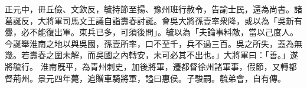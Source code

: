\begin{pinyinscope}
 
正元中，毌丘儉、文欽反，毓持節至揚、豫州班行赦令，告諭士民，還為尚書。諸葛誕反，大將軍司馬文王議自詣壽春討誕。會吳大將孫壹率衆降，或以為「吳新有釁，必不能復出軍。東兵已多，可須後問」。毓以為「夫論事料敵，當以己度人。今誕舉淮南之地以與吳國，孫壹所率，口不至千，兵不過三百。吳之所失，蓋為無幾。若壽春之圍未解，而吳國之內轉安，未可必其不出也。」大將軍曰：「善。」遂將毓行。
 淮南旣平，為青州刺史，加後將軍，遷都督徐州諸軍事，假節，又轉都督荊州。景元四年薨，追贈車騎將軍，謚曰惠侯。子駿嗣。毓弟會，自有傳。
 
 
\end{pinyinscope}